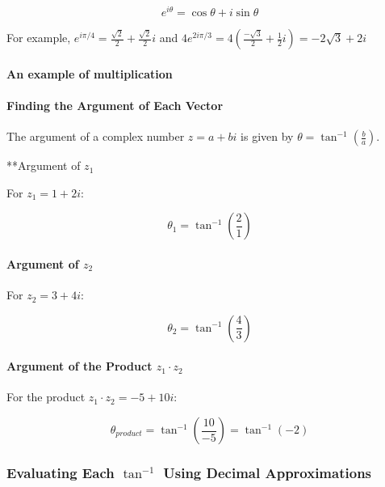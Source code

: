 \documentclass[
]{article}
\begin{document}
\[e^{i\theta} = \cos \theta + i \sin \theta\]

For example, \(e^{i \pi/4} = \frac{\sqrt2}{2} + \frac{\sqrt2}{2}i\) and
\(4e^{2i \pi/3} = 4\left( \frac{-\sqrt3}{2} + \frac12 i \right ) = -2\sqrt{3} + 2 i\)

\paragraph{An example of
multiplication}\label{an-example-of-multiplication}

\paragraph{Finding the Argument of Each
Vector}\label{finding-the-argument-of-each-vector}

The argument of a complex number \(z = a + bi\) is given by
\(\theta = \tan^{-1}\left(\frac{b}{a}\right)\).

**Argument of \(z_1\)

For \(z_1 = 1 + 2i\):

\[
\theta_1 = \tan^{-1}\left(\frac{2}{1}\right)
\]

\paragraph{\texorpdfstring{Argument of
\(z_2\)}{Argument of z\_2}}\label{argument-of-z_2}

For \(z_2 = 3 + 4i\):

\[
\theta_2 = \tan^{-1}\left(\frac{4}{3}\right)
\]

\paragraph{\texorpdfstring{Argument of the Product
\(z_1 \cdot z_2\)}{Argument of the Product z\_1 \textbackslash cdot z\_2}}\label{argument-of-the-product-z_1-cdot-z_2}

For the product \(z_1 \cdot z_2 = -5 + 10i\):

\[
\theta_{product} = \tan^{-1}\left(\frac{10}{-5}\right) = \tan^{-1}(-2)
\]

\subsubsection{\texorpdfstring{Evaluating Each \(\tan^{-1}\) Using
Decimal
Approximations}{Evaluating Each \textbackslash tan\^{}\{-1\} Using Decimal Approximations}}\label{evaluating-each-tan-1-using-decimal-approximations}
\end{document}
